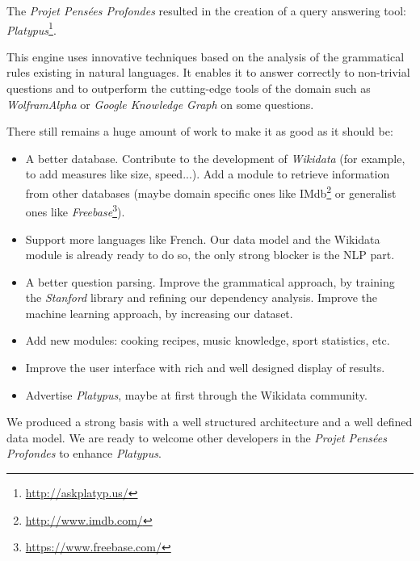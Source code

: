 The \emph{Projet Pensées Profondes} resulted in the creation of a query answering tool: \emph{Platypus}\footnote{\url{http://askplatyp.us/}}.

This engine uses innovative techniques based on the analysis of the grammatical rules existing in natural languages. It enables it to answer correctly to non-trivial questions and to outperform the cutting-edge tools of the domain such as \emph{WolframAlpha} or \emph{Google Knowledge Graph} on some questions.

There still remains a huge amount of work to make it as good as it should be:
\begin{itemize}
    \item A better database. Contribute to the development of \emph{Wikidata} (for example, to add measures like size, speed...). Add a module to retrieve information from other databases (maybe domain specific ones like IMdb\footnote{\url{http://www.imdb.com/}} or generalist ones like \emph{Freebase}\footnote{\url{https://www.freebase.com/}}).
    \item Support more languages like French. Our data model and the Wikidata module is already ready to do so, the only strong blocker is the NLP part.
    \item A better question parsing. Improve the grammatical approach, by training the \emph{Stanford} library and refining our dependency analysis. Improve the machine learning approach, by increasing our dataset.
    \item Add new modules: cooking recipes, music knowledge, sport statistics, etc.
    \item Improve the user interface with rich and well designed display of results.
    \item Advertise \emph{Platypus}, maybe at first through the Wikidata community.
\end{itemize}

We produced a strong basis with a well structured architecture and a well defined data model. We are ready to welcome other developers in the \emph{Projet Pensées Profondes} to enhance \emph{Platypus}.
